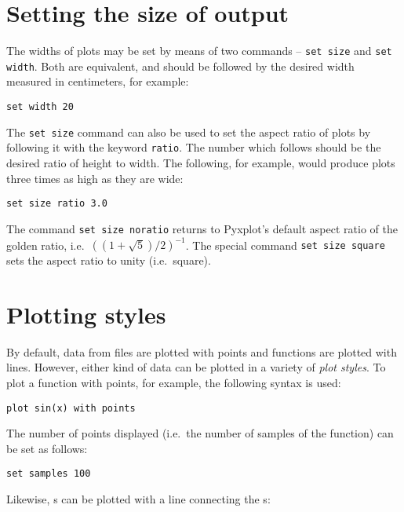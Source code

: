 \section{Setting the size of output}

The widths of plots may be set by means of two commands -- {\tt set
size} and {\tt set width}. Both are
equivalent, and should be followed by the desired width measured in
centimeters, for example:

\begin{verbatim}
set width 20
\end{verbatim}

The {\tt set size} command can also be used to set the aspect ratio of plots by
following it with the keyword {\tt ratio}. The number
which follows should be the desired ratio of height to width. The following,
for example, would produce plots three times as high as they are wide:

\begin{verbatim}
set size ratio 3.0
\end{verbatim}

\noindent The command {\tt set size noratio} returns to Pyxplot's default
aspect ratio of the golden ratio, i.e.\ $\left((1+\sqrt{5})/2\right)^{-1}$. The
special command {\tt set size square} sets the aspect
ratio to unity (i.e.\ square).

\section{Plotting styles}
\label{sec:plotting_styles}

By default, data from files are plotted with points and functions are plotted
with lines. However, either kind of data can be plotted in a variety of {\it
plot styles}.  To plot a function with points, for example, the following
syntax is used:

\begin{verbatim}
plot sin(x) with points
\end{verbatim}

\noindent The number of points displayed (i.e.\ the number of samples of the
function) can be set as follows:

\begin{verbatim}
set samples 100
\end{verbatim}

\noindent Likewise, \datafile s can be plotted with a line connecting the
\datapoint s:

